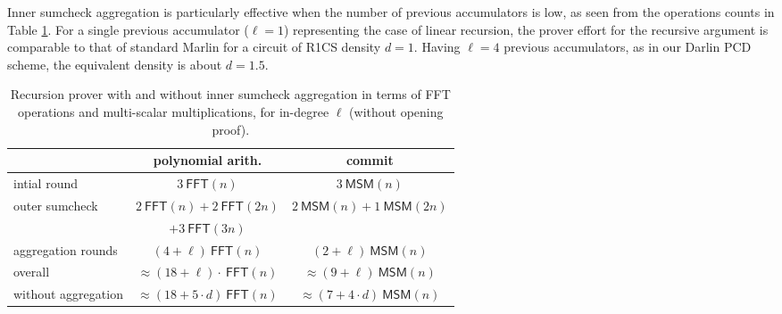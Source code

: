 \documentclass[10pt,article,oneside]{memoir}
\theoremstyle{definition}
\theoremstyle{remark}
\begin{document}
Inner sumcheck aggregation is particularly effective when the number of previous accumulators is low, as seen from the operations counts in Table \ref{t:InnerSumcheckAggregation}.
For a single previous accumulator ($\ell=1$) representing the case of linear recursion, the prover effort for the recursive argument is comparable to that of standard Marlin for a circuit of R1CS density $d=1$.
Having $\ell=4$ previous accumulators, as in our Darlin PCD scheme, the equivalent density is about $d=1.5$.

\begin{table}[h!]
\caption{%
Recursion prover with and without inner sumcheck aggregation in terms of FFT operations and multi-scalar multiplications, for in-degree $\ell$ (without opening proof).
}
\label{t:InnerSumcheckAggregation}
\vspace*{3mm}
\centering
\begin{tabular}{|l|c|c|}
\cline{2-3}
\multicolumn{1}{c|}{} & polynomial arith. & commit
\\\hline
 intial round  &  $3 ~\textsf{FFT}(n)$   & $3~\textsf{MSM}(n)$
\\
\multirow{2}{*}{outer sumcheck
}  
	&  $2 ~\textsf{FFT}(n) + 2~\textsf{FFT}(2n)$
		& \multirow{2}{*}{$2 ~\textsf{MSM}(n) + 1~\textsf{MSM}(2n)$}
\\
	& $+ 3~\textsf{FFT}(3n)$
		&
\\
aggregation rounds 
	& $(4+\ell)~\textsf{FFT}(n)$
		& $(2+\ell)~\textsf{MSM}(n)$ 

\\\hline
overall 
	 &  $\approx  (18+ \ell)\cdot ~\textsf{FFT}(n)$ 
		& $\approx (9+\ell)~\textsf{MSM}(n)$
\\\hline\hline
without aggregation
	 &  $\approx  (18 + 5\cdot d)~\textsf{FFT}(n)$ 
		& $\approx (7+4\cdot d)~\textsf{MSM}(n)$
\\\hline
\end{tabular}
\end{table}
\end{document}
